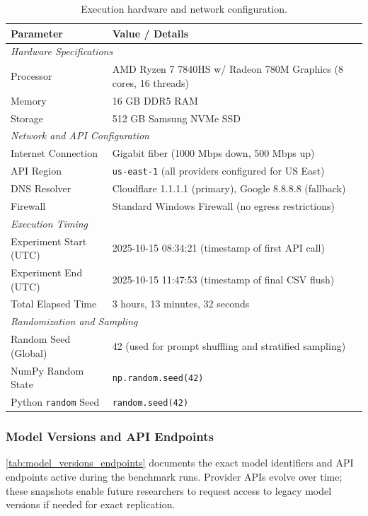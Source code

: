 \begin{table}[h!]
\centering
\caption{Execution hardware and network configuration.\label{tab:execution_context}}
\begin{tabularx}{\textwidth}{@{}l X@{}}
\toprule
\textbf{Parameter} & \textbf{Value / Details} \\
\midrule
\multicolumn{2}{l}{\textit{Hardware Specifications}} \\
Processor & AMD Ryzen 7 7840HS w/ Radeon 780M Graphics (8 cores, 16 threads) \\
Memory & 16 GB DDR5 RAM \\
Storage & 512 GB Samsung NVMe SSD \\
\midrule
\multicolumn{2}{l}{\textit{Network and API Configuration}} \\
Internet Connection & Gigabit fiber (1000 Mbps down, 500 Mbps up) \\
API Region & \texttt{us-east-1} (all providers configured for US East) \\
DNS Resolver & Cloudflare 1.1.1.1 (primary), Google 8.8.8.8 (fallback) \\
Firewall & Standard Windows Firewall (no egress restrictions) \\
\midrule
\multicolumn{2}{l}{\textit{Execution Timing}} \\
Experiment Start (UTC) & 2025-10-15 08:34:21 (timestamp of first API call) \\
Experiment End (UTC) & 2025-10-15 11:47:53 (timestamp of final CSV flush) \\
Total Elapsed Time & 3 hours, 13 minutes, 32 seconds \\
\midrule
\multicolumn{2}{l}{\textit{Randomization and Sampling}} \\
Random Seed (Global) & 42 (used for prompt shuffling and stratified sampling) \\
NumPy Random State & \texttt{np.random.seed(42)} \\
Python \texttt{random} Seed & \texttt{random.seed(42)} \\
\bottomrule
\end{tabularx}
\end{table}

\subsubsection{Model Versions and API Endpoints}

\cref{tab:model_versions_endpoints} documents the exact model identifiers and API endpoints active during the benchmark runs. Provider APIs evolve over time; these snapshots enable future researchers to request access to legacy model versions if needed for exact replication.

